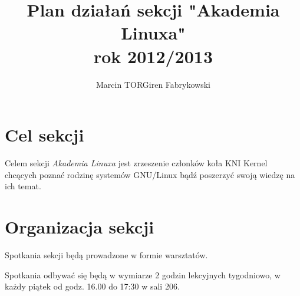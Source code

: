 \documentclass[a4paper,12pt]{article}
\title{Plan działań sekcji "Akademia Linuxa"\\rok 2012/2013}
\author{Marcin TORGiren Fabrykowski}
\begin{document}
\maketitle
\newpage
\section{Cel sekcji}
Celem sekcji \textit{Akademia Linuxa} jest zrzeszenie członków koła KNI Kernel chcących poznać rodzinę systemów GNU/Linux bądź poszerzyć swoją wiedzę na ich temat.
\section{Organizacja sekcji}
Spotkania sekcji będą prowadzone w formie warsztatów.

Spotkania odbywać się będą w wymiarze 2 godzin lekcyjnych tygodniowo, w każdy piątek od godz. 16.00 do 17:30 w sali 206.
\end{document}
